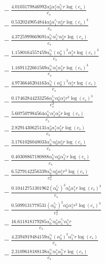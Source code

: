 \documentclass[10pt]{article}
\begin{document}
\begin{align*}
&{}  - \frac{4.0103179846992 \alpha_{0}^s \alpha_{1}^s \alpha_{2}^{c_s} r \log{\left(c_{s} \right)}}{c_{s}} \\
&{}  - \frac{0.5320249054844 \alpha_{0}^s \alpha_{1}^{c_s} \alpha_{2}^s r \log{\left(c_{s} \right)}^{3}}{c_{s}} \\
&{}  - \frac{4.3725999669691 \alpha_{0}^{c_s} \alpha_{1}^{c_s} \alpha_{2}^s r \log{\left(c_{s} \right)}}{c_{s}} \\
&{}  - \frac{1.1580164557459 \alpha_{0}^{c_s} \left(\alpha_{0}^s\right)^{3} \alpha_{1}^s r \log{\left(c_{s} \right)}^{3}}{c_{s}} \\
&{}  - \frac{1.1691122661569 \alpha_{0}^{c_s} \alpha_{1}^s \alpha_{2}^s r \log{\left(c_{s} \right)}^{3}}{c_{s}} \\
&{}  - \frac{4.9736646204163 \alpha_{0}^{c_s} \left(\alpha_{0}^s\right)^{3} \alpha_{1}^s r \log{\left(c_{s} \right)}}{c_{s}} \\
&{}  - \frac{0.17462844233256 \alpha_{0}^{c_s} \alpha_{0}^s \alpha_{1}^s r^{3} \log{\left(c_{s} \right)}^{3}}{c_{s}^{3}} \\
&{}  - \frac{5.607507984564 \alpha_{0}^{c_s} \alpha_{1}^s \alpha_{2}^s r \log{\left(c_{s} \right)}}{c_{s}} \\
&{}  - \frac{2.8291430625131 \alpha_{0}^s \alpha_{1}^s \alpha_{2}^s r \log{\left(c_{s} \right)}}{c_{s}} \\
&{}  - \frac{3.1761026048033 \alpha_{0}^{c_s} \alpha_{0}^s \alpha_{3}^s r \log{\left(c_{s} \right)}}{c_{s}} \\
&{}  - \frac{0.40308867180888 \alpha_{0}^{c_s} \alpha_{0}^s \alpha_{3}^{c_s} r \log{\left(c_{s} \right)}}{c_{s}} \\
&{}  - \frac{6.5279142256339 \alpha_{0}^{c_s} \alpha_{0}^s \alpha_{1}^s r^{3} \log{\left(c_{s} \right)}}{c_{s}^{3}} \\
&{}  - \frac{0.10412751301962 \left(\alpha_{0}^{c_s}\right)^{3} \alpha_{0}^s \alpha_{1}^s r \log{\left(c_{s} \right)}^{3}}{c_{s}} \\
&{}  - \frac{0.5099131778531 \left(\alpha_{0}^{c_s}\right)^{2} \alpha_{0}^s \alpha_{1}^s r^{2} \log{\left(c_{s} \right)}^{3}}{c_{s}^{2}} \\
&{}  - \frac{16.611818179285 \alpha_{0}^{c_s} \alpha_{0}^s \alpha_{1}^{c_s} \alpha_{1}^s r}{c_{s}} \\
&{}  - \frac{4.2394919484159 \alpha_{0}^{c_s} \left(\alpha_{0}^s\right)^{3} \alpha_{1}^{c_s} r \log{\left(c_{s} \right)}}{c_{s}} \\
&{}  - \frac{2.3109618188138 \alpha_{0}^{c_s} \alpha_{1}^s \alpha_{2}^{c_s} r \log{\left(c_{s} \right)}}{c_{s}} \\

\end{align*}
\end{document}
